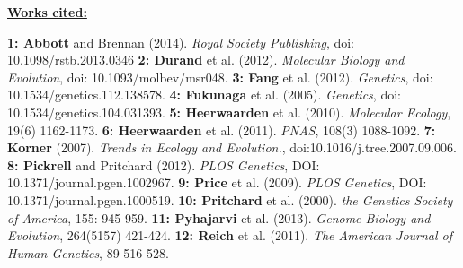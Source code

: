 \documentclass[12pt]{amsart}
\begin{document}
\hfill\break \textbf{\underline{Works cited:}}
\small{ 
\textbf{1: Abbott} and Brennan (2014). \textit{Royal Society Publishing}, doi: 10.1098/rstb.2013.0346
\textbf{2: Durand} et al. (2012). \textit{Molecular Biology and Evolution}, doi: 10.1093/molbev/msr048.
\textbf{3: Fang} et al. (2012). \textit{Genetics}, doi: 10.1534/genetics.112.138578. 
\textbf{4: Fukunaga} et al. (2005). \textit{Genetics}, doi: 10.1534/genetics.104.031393. 
\textbf{5: Heerwaarden} et al. (2010). \textit{Molecular Ecology}, 19(6) 1162-1173. 
\textbf{6: Heerwaarden} et al. (2011). \textit{PNAS}, 108(3) 1088-1092.  
\textbf{7: Korner} (2007). \textit{Trends in Ecology and Evolution.}, doi:10.1016/j.tree.2007.09.006.
\textbf{8: Pickrell} and Pritchard (2012). \textit{PLOS Genetics}, DOI: 10.1371/journal.pgen.1002967. 
\textbf{9: Price} et al. (2009). \textit{PLOS Genetics}, DOI: 10.1371/journal.pgen.1000519. 
\textbf{10: Pritchard} et al. (2000). \textit{the Genetics Society of America}, 155: 945-959.  
\textbf{11: Pyhajarvi} et al. (2013). \textit{Genome Biology and Evolution}, 264(5157) 421-424.  
\textbf{12: Reich} et al. (2011). \textit{The American Journal of Human Genetics}, 89 516-528.

}
\end{document}
